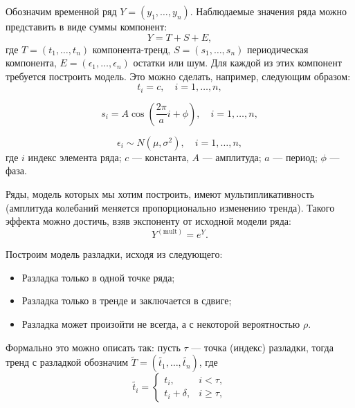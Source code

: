 \documentclass[%
12pt,
master,  %
natbib,      %
subf,        %
substylefile = spbu.rtx,
href,        %
colorlinks,  %
]{disser}
\begin{document}
Обозначим временной ряд $Y = (y_1, \dots, y_n)$. Наблюдаемые значения ряда можно представить в виде суммы компонент:
\begin{equation*}
Y = T + S + E ,
\end{equation*}
где  $ T = (t_1, \dots, t_n) $ компонента-тренд, $ S = (s_1, \dots, s_n) $ периодическая компонента, $ E = (\epsilon_1, \dots, \epsilon_n) $ остатки или шум.
Для каждой из этих компонент требуется построить модель. Это можно сделать, например, следующим образом:
\begin{equation*}
t_i = c, \quad i = 1, \dots, n, 
\end{equation*}

\begin{equation*}
s_i = A \cos \left( \frac{2\pi}{a} i + \phi \right), \quad i = 1, \dots, n,
\end{equation*}

\begin{equation*}
\epsilon_i \sim N(\mu, \sigma^2), \quad i = 1, \dots, n, 
\end{equation*}
где $i$ индекс элемента ряда; $c$ --- константа, $A$ --- амплитуда; $a$ --- период; $\phi$ --- фаза.

Ряды, модель которых мы хотим построить, имеют мультипликативность (амплитуда колебаний меняется пропорционально изменению тренда). Такого эффекта можно достичь, взяв экспоненту от исходной модели ряда:
\begin{equation*}
Y^{\mathrm{(mult)}} = e^{Y}. 
\end{equation*}

Построим модель разладки, исходя из следующего:
\begin{itemize}
	\item Разладка только в одной точке ряда;
	\item Разладка только в тренде и заключается в сдвиге;
	\item Разладка может произойти не всегда, а с некоторой вероятностью $\rho$.
\end{itemize}
Формально это можно описать так: пусть $\tau$ --- точка (индекс) разладки, тогда тренд с разладкой обозначим $ \tilde{T} = (\tilde{t_1}, \dots, \tilde{t_n}) $, где
\begin{equation*}
\tilde{t_i} =
	\begin{cases}
		t_i, & i < \tau, \\
		t_i + \delta, & i \geqslant \tau,
	\end{cases}
\end{equation*}
\end{document}
